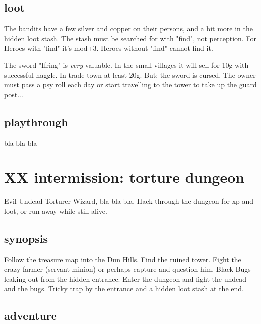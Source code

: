 \subsection*{loot}

The bandits have a few silver and copper on their persons, and a bit more in the hidden loot stash. The stash must be searched for with "find", not perception. For Heroes with "find" it's mod+3. Heroes without "find" cannot find it.

The sword "Ifring" is \emph{very} valuable. In the small villages it will sell for 10g with successful haggle. In trade town at least 20g. But: the sword is cursed. The owner must pass a psy roll each day or start travelling to the tower to take up the guard post...


\subsection*{playthrough}

bla bla bla







\newpage
\section*{XX intermission: torture dungeon}

Evil Undead Torturer Wizard, bla bla bla. Hack through the dungeon for xp and loot, or run away while still alive.


\subsection*{synopsis}

Follow the treasure map into the Dun Hills. Find the ruined tower. Fight the crazy farmer (servant minion) or perhaps capture and question him. Black Bugs leaking out from the hidden entrance. Enter the dungeon and fight the undead and the bugs. Tricky trap by the entrance and a hidden loot stash at the end.


\subsection*{adventure}

